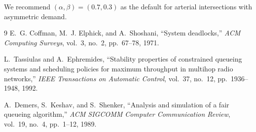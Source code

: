 \documentclass[11pt]{article}
\begin{document}
We recommend $(\alpha, \beta) = (0.7, 0.3)$ as the default for arterial intersections
with asymmetric demand.

\begin{thebibliography}{9}
  E.~G. Coffman, M.~J. Elphick, and A.~Shoshani,
  ``System deadlocks,''
  \textit{ACM Computing Surveys}, vol.~3, no.~2, pp.~67--78, 1971.

  L.~Tassiulas and A.~Ephremides,
  ``Stability properties of constrained queueing systems and scheduling policies
  for maximum throughput in multihop radio networks,''
  \textit{IEEE Transactions on Automatic Control}, vol.~37, no.~12,
  pp.~1936--1948, 1992.

  A.~Demers, S.~Keshav, and S.~Shenker,
  ``Analysis and simulation of a fair queueing algorithm,''
  \textit{ACM SIGCOMM Computer Communication Review}, vol.~19, no.~4,
  pp.~1--12, 1989.
\end{thebibliography}
\end{document}
